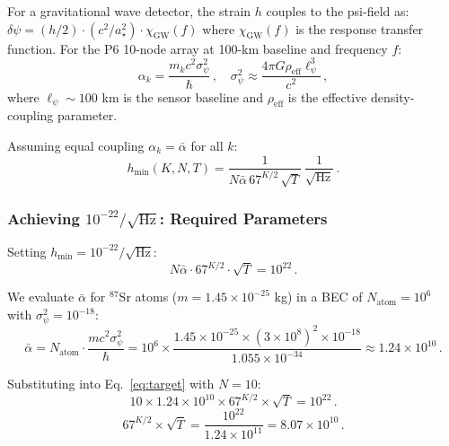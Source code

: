 \documentclass[11pt]{article}
\theoremstyle{definition}
\theoremstyle{remark}
\newcommand{\hmin}{h_{\min}}
\begin{document}
For a gravitational wave detector, the strain $h$ couples to the psi-field as:
$\delta\psi = (h/2) \cdot (c^2/a_\star^2) \cdot \chi_{\mathrm{GW}}(f)$ where
$\chi_{\mathrm{GW}}(f)$ is the response transfer function. For the P6
10-node array at 100-km baseline and frequency $f$:
\begin{equation}
\alpha_k = \frac{m_k c^2 \sigma_\psi^2}{\hbar}\,, \quad
\sigma_\psi^2 \approx \frac{4\pi G \rho_{\mathrm{eff}} \ell_\psi^3}{c^2}\,,
\end{equation}
where $\ell_\psi \sim 100$ km is the sensor baseline and $\rho_{\mathrm{eff}}$
is the effective density-coupling parameter.

Assuming equal coupling $\alpha_k = \bar{\alpha}$ for all $k$:
\begin{equation}
\boxed{
\hmin(K,N,T) = \frac{1}{N\bar{\alpha}\,67^{K/2}\,\sqrt{T}}\,
\frac{1}{\sqrt{\mathrm{Hz}}}\,.
}
\label{eq:hmin-full}
\end{equation}

\subsubsection{Achieving $10^{-22}/\sqrt{\mathrm{Hz}}$: Required Parameters}

Setting $\hmin = 10^{-22}/\sqrt{\mathrm{Hz}}$:
\begin{equation}
N \bar{\alpha} \cdot 67^{K/2} \cdot \sqrt{T} = 10^{22}\,.
\label{eq:target}
\end{equation}

We evaluate $\bar{\alpha}$ for $^{87}$Sr atoms ($m = 1.45 \times 10^{-25}$ kg)
in a BEC of $N_{\mathrm{atom}} = 10^6$ with $\sigma_\psi^2 = 10^{-18}$:
\begin{equation}
\bar{\alpha} = N_{\mathrm{atom}} \cdot
\frac{m c^2 \sigma_\psi^2}{\hbar} =
10^6 \times \frac{1.45\times 10^{-25} \times (3\times 10^8)^2
\times 10^{-18}}{1.055 \times 10^{-34}} \approx 1.24 \times 10^{10}\,.
\end{equation}

Substituting into Eq.~\eqref{eq:target} with $N = 10$:
\begin{equation}
10 \times 1.24\times 10^{10} \times 67^{K/2} \times \sqrt{T} = 10^{22}\,.
\end{equation}
\begin{equation}
67^{K/2} \times \sqrt{T} = \frac{10^{22}}{1.24 \times 10^{11}} = 8.07 \times
10^{10}\,.
\label{eq:target2}
\end{equation}
\end{document}
